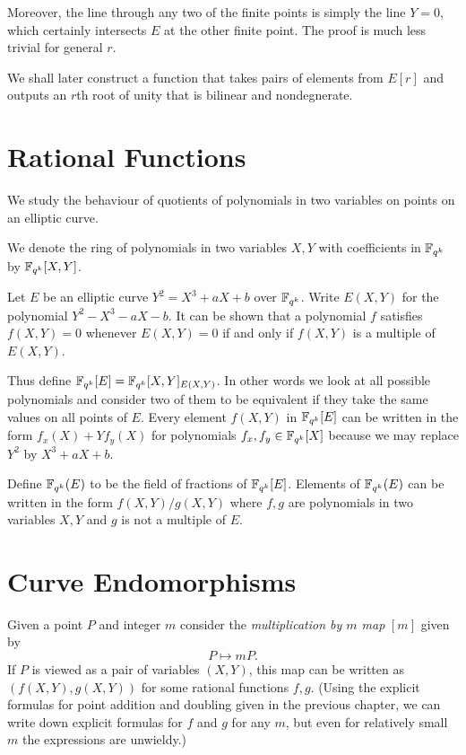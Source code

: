 Moreover,
the line through any two of the finite points is simply the line $Y = 0$,
which certainly intersects $E$ at the other finite point.
The proof is much less trivial for general $r$.

We shall later construct a function
that takes pairs of elements from $E[r]$ and outputs an $r$th root of unity
that is bilinear and nondegnerate.

\section {Rational Functions}

We study the behaviour of quotients of polynomials in two variables on
points on an elliptic curve.

We denote the ring of polynomials in two variables $X,Y$
with coefficients in $\mathbb{F}_{q^k}$ by $\mathbb{F}_{q^k}[X,Y]$. 

Let $E$ be an elliptic curve $Y^2 = X^3 + aX + b$ over $\mathbb{F}_{q^k}$.
Write $E(X,Y)$ for the polynomial $Y^2 - X^3 - aX - b$.
It can be shown that a polynomial $f$ satisfies $f(X,Y) = 0$
whenever $E(X,Y) = 0$ if and only if $f(X,Y)$ is a multiple of $E(X,Y)$.

Thus define $\mathbb{F}_{q^k}[E] = \mathbb{F}_{q^k}[X,Y]_{E(X,Y)}$. In other words we look at all
possible polynomials and consider two of them to be
equivalent if they take the same values on all points of $E$.
Every element $f(X,Y)$ in $\mathbb{F}_{q^k}[E]$ can be written in the form
$f_x(X) + Y f_y(X)$ for polynomials $f_x, f_y \in \mathbb{F}_{q^k}[X]$ because
we may replace $Y^2$ by $X^3 + aX + b$.

Define $\mathbb{F}_{q^k}(E)$ to be the field of fractions of $\mathbb{F}_{q^k}[E]$.
Elements of $\mathbb{F}_{q^k}(E)$ can be written in the form
$f(X,Y) / g(X,Y)$ where $f, g$ are polynomials in two variables $X, Y$
and $g$ is not a multiple of $E$.

\section {Curve Endomorphisms}

Given a point $P$ and integer $m$ consider the \emph{multiplication by $m$ map}
$[m]$ given by \[ P \mapsto m P . \]
If $P$ is viewed as a pair of variables $(X,Y)$, this map
can be written as $(f(X,Y), g(X,Y))$ for some rational functions $f,g$.
(Using the explicit formulas for point addition and doubling
given in the previous chapter, we can write down
explicit formulas for $f$ and $g$ for any $m$, but even for relatively
small $m$ the expressions are unwieldy.)

